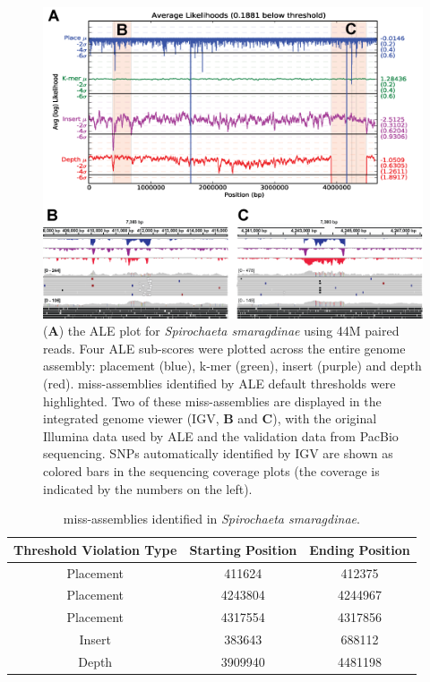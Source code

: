 \documentclass[phd,tocprelim]{cornell}
\begin{document}
\begin{figure}[!tpb]%
    \centerline{\includegraphics[width=\textwidth]{figures/ALE/Clark_Fig5c.png}}
    \caption[ALE performance on real reads]{({\bf A}) the ALE plot for {\it Spirochaeta smaragdinae} using 44M paired reads. Four ALE sub-scores were plotted across the entire genome assembly: placement (blue), k-mer (green), insert (purple) and depth (red). miss-assemblies identified by ALE default thresholds were highlighted. Two of these miss-assemblies are displayed in the integrated genome viewer (IGV, {\bf B} and {\bf C}), with the original Illumina data used by ALE and the validation data from PacBio sequencing. SNPs automatically identified by IGV are shown as colored bars in the sequencing coverage plots (the coverage is indicated by the numbers on the left).}\label{ALEfig5}
\end{figure}

\begin{table}[!htp]
    \caption{miss-assemblies identified in {\it Spirochaeta smaragdinae}.}
    \label{ALEtab1}
    \begin{center}
\begin{tabular}{c|c|c}
Threshold Violation Type & Starting Position & Ending Position\\\hline
Placement & 411624 & 412375\\
Placement & 4243804 & 4244967\\
Placement & 4317554 & 4317856\\
Insert & 383643 & 688112\\
Depth & 3909940 & 4481198\\
\end{tabular}
\end{center}
\end{table}
\end{document}
